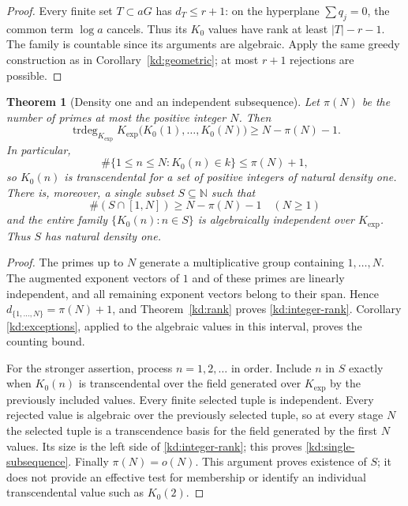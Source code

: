 \documentclass[11pt]{article}
\newtheorem{theorem}{Theorem}[section]
\theoremstyle{definition}
\theoremstyle{remark}
\begin{document}
\begin{proof}
Every finite set $T\subset aG$ has $d_T\leq r+1$: on the hyperplane
$\sum q_j=0$, the common term $\log a$ cancels.  Thus its $K_0$ values
have rank at least $|T|-r-1$.  The family is countable since its
arguments are algebraic.  Apply the same greedy construction as in
Corollary~\ref{kd:geometric}; at most $r+1$ rejections are possible.
\end{proof}

\begin{theorem}[Density one and an independent subsequence]
\label{kd:density}
Let $\pi(N)$ be the number of primes at most the positive integer $N$.
Then
\begin{equation}\label{kd:integer-rank}
 \operatorname{trdeg}_{K_{\exp}}
 K_{\exp}\bigl(K_0(1),\ldots,K_0(N)\bigr)
 \geq N-\pi(N)-1.
\end{equation}
In particular,
\[
 \#\{1\leq n\leq N:K_0(n)\in k\}\leq\pi(N)+1,
\]
so $K_0(n)$ is transcendental for a set of positive integers of natural
density one.  There is, moreover, a single subset $S\subseteq\mathbb N$
such that
\begin{equation}\label{kd:single-subsequence}
 \#(S\cap[1,N])\geq N-\pi(N)-1\quad(N\geq1)
\end{equation}
and the entire family $\{K_0(n):n\in S\}$ is algebraically independent
over $K_{\exp}$.  Thus $S$ has natural density one.
\end{theorem}

\begin{proof}
The primes up to $N$ generate a multiplicative group containing
$1,\ldots,N$.  The augmented exponent vectors of $1$ and of these
primes are linearly independent, and all remaining exponent vectors
belong to their span.  Hence $d_{\{1,\ldots,N\}}=\pi(N)+1$, and
Theorem~\ref{kd:rank} proves \eqref{kd:integer-rank}.  Corollary
\ref{kd:exceptions}, applied to the algebraic values in this interval,
proves the counting bound.

For the stronger assertion, process $n=1,2,\ldots$ in order.  Include
$n$ in $S$ exactly when $K_0(n)$ is transcendental over the field
generated over $K_{\exp}$ by the previously included values.  Every
finite selected tuple is independent.  Every rejected value is
algebraic over the previously selected tuple, so at every stage $N$
the selected tuple is a transcendence basis for the field generated by
the first $N$ values.  Its size is the left side of
\eqref{kd:integer-rank}; this proves \eqref{kd:single-subsequence}.
Finally $\pi(N)=o(N)$.  This argument proves existence of $S$; it does
not provide an effective test for membership or identify an individual
transcendental value such as $K_0(2)$.
\end{proof}
\end{document}
